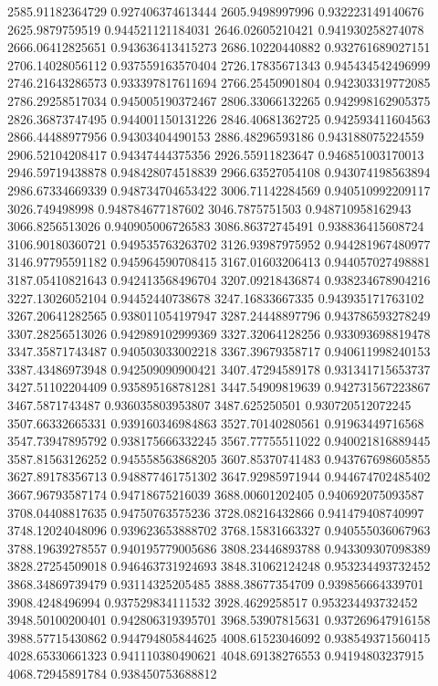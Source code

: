 {2585.91182364729 0.927406374613444
2605.9498997996 0.932223149140676
2625.9879759519 0.944521121184031
2646.02605210421 0.941930258274078
2666.06412825651 0.943636413415273
2686.10220440882 0.932761689027151
2706.14028056112 0.937559163570404
2726.17835671343 0.945434542496999
2746.21643286573 0.933397817611694
2766.25450901804 0.942303319772085
2786.29258517034 0.945005190372467
2806.33066132265 0.942998162905375
2826.36873747495 0.944001150131226
2846.40681362725 0.942593411604563
2866.44488977956 0.94303404490153
2886.48296593186 0.943188075224559
2906.52104208417 0.94347444375356
2926.55911823647 0.946851003170013
2946.59719438878 0.948428074518839
2966.63527054108 0.943074198563894
2986.67334669339 0.948734704653422
3006.71142284569 0.940510992209117
3026.749498998 0.948784677187602
3046.7875751503 0.948710958162943
3066.8256513026 0.940905006726583
3086.86372745491 0.938836415608724
3106.90180360721 0.949535763263702
3126.93987975952 0.944281967480977
3146.97795591182 0.945964590708415
3167.01603206413 0.944057027498881
3187.05410821643 0.942413568496704
3207.09218436874 0.938234678904216
3227.13026052104 0.94452440738678
3247.16833667335 0.943935171763102
3267.20641282565 0.938011054197947
3287.24448897796 0.943786593278249
3307.28256513026 0.942989102999369
3327.32064128256 0.933093698819478
3347.35871743487 0.940503033002218
3367.39679358717 0.940611998240153
3387.43486973948 0.942509090900421
3407.47294589178 0.931341715653737
3427.51102204409 0.935895168781281
3447.54909819639 0.942731567223867
3467.5871743487 0.936035803953807
3487.625250501 0.930720512072245
3507.66332665331 0.939160346984863
3527.70140280561 0.91963449716568
3547.73947895792 0.938175666332245
3567.77755511022 0.940021816889445
3587.81563126252 0.945558563868205
3607.85370741483 0.943767698605855
3627.89178356713 0.948877461751302
3647.92985971944 0.944674702485402
3667.96793587174 0.94718675216039
3688.00601202405 0.940692075093587
3708.04408817635 0.94750763575236
3728.08216432866 0.941479408740997
3748.12024048096 0.939623653888702
3768.15831663327 0.940555036067963
3788.19639278557 0.940195779005686
3808.23446893788 0.943309307098389
3828.27254509018 0.946463731924693
3848.31062124248 0.953234493732452
3868.34869739479 0.93114325205485
3888.38677354709 0.939856664339701
3908.4248496994 0.937529834111532
3928.4629258517 0.953234493732452
3948.50100200401 0.942806319395701
3968.53907815631 0.937269647916158
3988.57715430862 0.944794805844625
4008.61523046092 0.938549371560415
4028.65330661323 0.941110380490621
4048.69138276553 0.94194803237915
4068.72945891784 0.938450753688812
}
